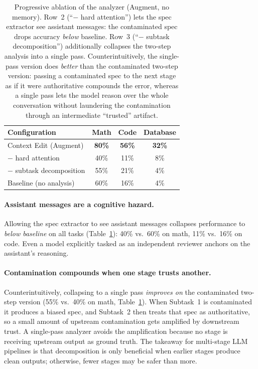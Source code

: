 \documentclass{article}
\begin{document}
\begin{table}[t]
\centering
\begin{tabular}{lccc}
\toprule
\textbf{Configuration} & \textbf{Math} & \textbf{Code} & \textbf{Database} \\
\midrule
Context Edit (Augment) & \textbf{80\%} & \textbf{56\%} & \textbf{32\%} \\
\quad $-$ hard attention & 40\% & 11\% & 8\% \\
\quad\quad $-$ subtask decomposition & 55\% & 21\% & 4\% \\
\midrule
Baseline (no analysis) & 60\% & 16\% & 4\% \\
\bottomrule
\end{tabular}
\caption{Progressive ablation of the analyzer (Augment, no memory). Row~2 (``$-$ hard attention'') lets the spec extractor see assistant messages: the contaminated spec drops accuracy \emph{below} baseline. Row~3 (``$-$ subtask decomposition'') additionally collapses the two-step analysis into a single pass. Counterintuitively, the single-pass version does \emph{better} than the contaminated two-step version: passing a contaminated spec to the next stage as if it were authoritative compounds the error, whereas a single pass lets the model reason over the whole conversation without laundering the contamination through an intermediate ``trusted'' artifact.}
\label{tab:cognitive-hazard}
\end{table}

\paragraph{Assistant messages are a cognitive hazard.}
Allowing the spec extractor to see assistant messages collapses performance to \emph{below baseline} on all tasks (Table~\ref{tab:cognitive-hazard}): 40\% vs.\ 60\% on math, 11\% vs.\ 16\% on code. Even a model explicitly tasked as an independent reviewer anchors on the assistant's reasoning.

\paragraph{Contamination compounds when one stage trusts another.}
Counterintuitively, collapsing to a single pass \emph{improves on} the contaminated two-step version (55\% vs.\ 40\% on math, Table~\ref{tab:cognitive-hazard}). When Subtask~1 is contaminated it produces a biased spec, and Subtask~2 then treats that spec as authoritative, so a small amount of upstream contamination gets amplified by downstream trust. A single-pass analyzer avoids the amplification because no stage is receiving upstream output as ground truth. The takeaway for multi-stage LLM pipelines is that decomposition is only beneficial when earlier stages produce clean outputs; otherwise, fewer stages may be safer than more.
\end{document}
